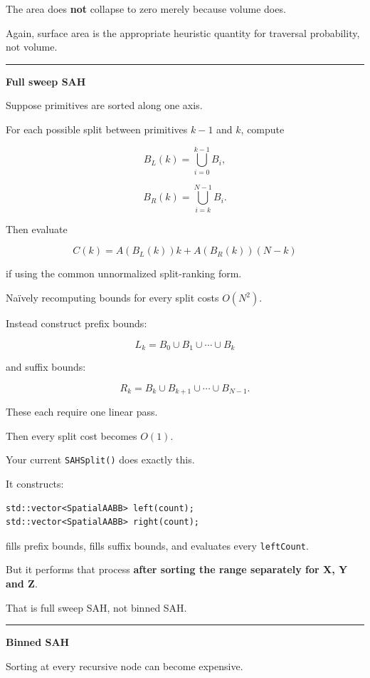 The area does \textbf{not} collapse to zero merely because volume does.

Again, surface area is the appropriate heuristic quantity for traversal probability, not volume.

\begin{center}\rule{0.5\linewidth}{0.5pt}\end{center}

\textbf{Full sweep SAH}

Suppose primitives are sorted along one axis.

For each possible split between primitives \(k-1\) and \(k\), compute

\[
B_L(k)
=
\bigcup_{i=0}^{k-1}B_i,
\]

\[
B_R(k)
=
\bigcup_{i=k}^{N-1}B_i.
\]

Then evaluate

\[
C(k)
=
A(B_L(k))k+
A(B_R(k))(N-k)
\]

if using the common unnormalized split-ranking form.

Naïvely recomputing bounds for every split costs \(O(N^2)\).

Instead construct prefix bounds:

\[
L_k=B_0\cup B_1\cup\cdots\cup B_k
\]

and suffix bounds:

\[
R_k=B_k\cup B_{k+1}\cup\cdots\cup B_{N-1}.
\]

These each require one linear pass.

Then every split cost becomes \(O(1)\).

Your current \texttt{SAHSplit()} does exactly this.

It constructs:

\begin{verbatim}
std::vector<SpatialAABB> left(count);
std::vector<SpatialAABB> right(count);
\end{verbatim}

fills prefix bounds, fills suffix bounds, and evaluates every \texttt{leftCount}.

But it performs that process \textbf{after sorting the range separately for X, Y and Z}.

That is full sweep SAH, not binned SAH.

\begin{center}\rule{0.5\linewidth}{0.5pt}\end{center}

\textbf{Binned SAH}

Sorting at every recursive node can become expensive.

